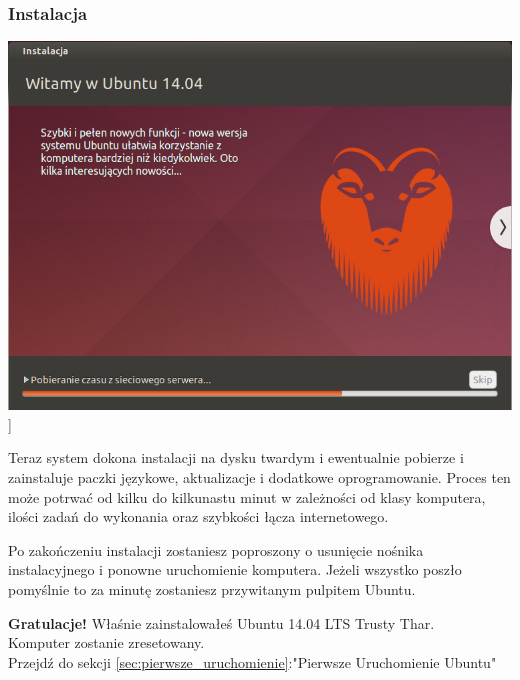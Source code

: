 \subsubsection{Instalacja}
\begin{center}
	\includegraphics[scale=0.5]{images/instalator_kopiowanie.png}]
\end{center}
Teraz system dokona instalacji na dysku twardym i ewentualnie pobierze i zainstaluje paczki językowe, aktualizacje i dodatkowe oprogramowanie. Proces ten może potrwać od kilku do kilkunastu minut w zależności od klasy komputera, ilości zadań do wykonania oraz szybkości łącza internetowego.

Po zakończeniu instalacji zostaniesz poproszony o usunięcie nośnika instalacyjnego i ponowne uruchomienie komputera. Jeżeli wszystko poszło pomyślnie to za minutę zostaniesz przywitanym pulpitem Ubuntu.

\begin{flushright}
\textbf{Gratulacje!} Właśnie zainstalowałeś Ubuntu 14.04 LTS Trusty Thar.\\
Komputer zostanie zresetowany.\\
Przejdź do sekcji \ref{sec:pierwsze_uruchomienie}:"Pierwsze Uruchomienie Ubuntu"
\end{flushright}
\clearpage